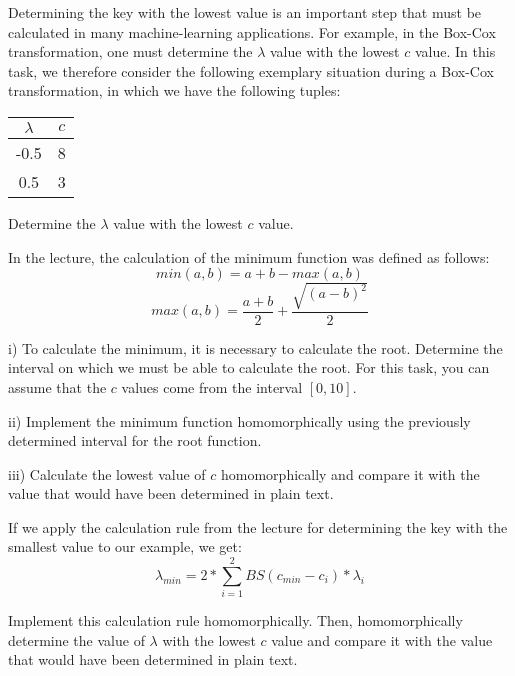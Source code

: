 \begin{aufgabe}
Determining the key with the lowest value is an important step that must be calculated in many machine-learning applications. For example, in the Box-Cox transformation, one must determine the $\lambda$ value with the lowest $c$ value. In this task, we therefore consider the following exemplary situation during a Box-Cox transformation, in which we have the following tuples: 

\begin{table}[h!]
    \centering
\begin{tabular}{c|c}
     $\lambda$ & $c$ \\ \hline
     -0.5 & 8 \\
     0.5  & 3
\end{tabular}
\end{table}


Determine the $\lambda$ value with the lowest $c$ value.

\begin{teilaufgabe}
    \item In the lecture, the calculation of the minimum function was defined as follows:
    \begin{equation}
        min(a,b) = a+b - max(a,b)
    \end{equation}
    \begin{equation}
        max(a,b) = \frac{a+b}{2} + \frac{\sqrt{(a-b)^2}}{2}
    \end{equation}
    \begin{teilaufgabe}
        \item[i)] To calculate the minimum, it is necessary to calculate the root. Determine the interval on which we must be able to calculate the root. For this task, you can assume that the $c$ values come from the interval $[0,10]$.
        \item[ii)] Implement the minimum function homomorphically using the previously determined interval for the root function.
        \item[iii)] Calculate the lowest value of $c$ homomorphically and compare it with the value that would have been determined in plain text.
    \end{teilaufgabe}
    \item If we apply the calculation rule from the lecture for determining the key with the smallest value to our example, we get: 
    \begin{equation}
        \lambda_{min} = 2 * \sum_{i=1}^2 BS( c_{min} - c_i ) * \lambda_{i}
    \end{equation}

    Implement this calculation rule homomorphically. Then, homomorphically determine the value of $\lambda$ with the lowest $c$ value and compare it with the value that would have been determined in plain text.
    
\end{teilaufgabe}


\end{aufgabe}
